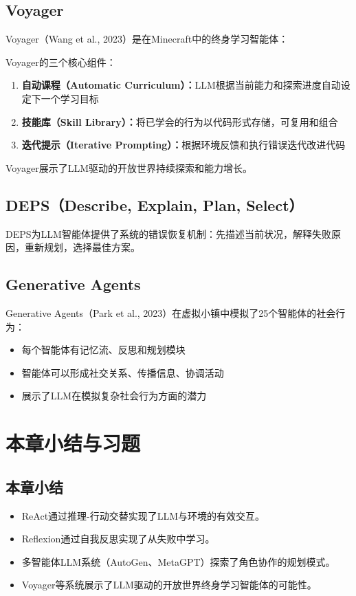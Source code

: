 \subsection{Voyager}

Voyager（Wang et al., 2023）是在Minecraft中的终身学习智能体：

\begin{keypoint}
Voyager的三个核心组件：
\begin{enumerate}
  \item \textbf{自动课程（Automatic Curriculum）：}LLM根据当前能力和探索进度自动设定下一个学习目标
  \item \textbf{技能库（Skill Library）：}将已学会的行为以代码形式存储，可复用和组合
  \item \textbf{迭代提示（Iterative Prompting）：}根据环境反馈和执行错误迭代改进代码
\end{enumerate}
Voyager展示了LLM驱动的开放世界持续探索和能力增长。
\end{keypoint}

\subsection{DEPS（Describe, Explain, Plan, Select）\self}

DEPS为LLM智能体提供了系统的错误恢复机制：先描述当前状况，解释失败原因，重新规划，选择最佳方案。

\subsection{Generative Agents \self}

Generative Agents（Park et al., 2023）在虚拟小镇中模拟了25个智能体的社会行为：
\begin{itemize}
  \item 每个智能体有记忆流、反思和规划模块
  \item 智能体可以形成社交关系、传播信息、协调活动
  \item 展示了LLM在模拟复杂社会行为方面的潜力
\end{itemize}

\section{本章小结与习题}

\subsection*{本章小结}
\begin{itemize}
  \item ReAct通过推理-行动交替实现了LLM与环境的有效交互。
  \item Reflexion通过自我反思实现了从失败中学习。
  \item 多智能体LLM系统（AutoGen、MetaGPT）探索了角色协作的规划模式。
  \item Voyager等系统展示了LLM驱动的开放世界终身学习智能体的可能性。
\end{itemize}

